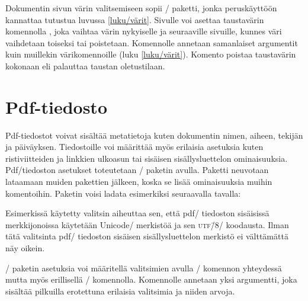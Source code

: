 Dokumentin sivun värin valitsemiseen sopii \-/
paketti, jonka peruskäyttöön kannattaa tutustua luvussa
\ref{luku/värit}. Sivulle voi asettaa taustavärin komennolla
, joka vaihtaa värin nykyiselle ja seuraaville
sivuille, kunnes väri vaihdetaan toiseksi tai poistetaan. Komennolle
annetaan samanlaiset argumentit kuin muillekin värikomennoille (luku
\ref{luku/värit}). Komento  poistaa taustavärin
kokonaan eli palauttaa taustan oletustilaan.

\begin{koodilohkosis}
\pagecolor{nimi} %
\pagecolor[värimalli]{parametrit}
\nopagecolor
\end{koodilohkosis}

\section{Pdf-tiedosto}
\label{luku/pdf-asetukset}

Pdf-tiedostot voivat sisältää metatietoja kuten dokumentin nimen,
aiheen, tekijän ja päiväyksen. Tiedostoille voi määrittää myös erilaisia
asetuksia kuten ristiviitteiden ja linkkien ulkoasun tai sisäisen
sisällysluettelon ominaisuuksia. Pdf\-/tiedoston asetukset toteutetaan
\-/ paketin avulla. Paketti neuvotaan lataamaan
muiden pakettien jälkeen, koska se lisää ominaisuuksia muihin
komentoihin. Paketin voisi ladata esimerkiksi seuraavalla tavalla:

\begin{koodilohkosis}
\usepackage[unicode]{hyperref}
\end{koodilohkosis}

\noindent
Esimerkissä käytetty valitsin  aiheuttaa sen, että pdf\-/
tiedoston sisäisissä merkkijonoissa käytetään Unicode\-/ merkistöä ja
sen \textsc{utf\=/8}\-/ koodausta. Ilman tätä valitsinta pdf\-/
tiedoston sisäisen sisällysluettelon merkistö ei välttämättä näy oikein.

\-/ paketin asetuksia voi määritellä valitsimien
avulla \-/ komennon yhteydessä mutta myös
erillisellä \-/ komennolla. Komennolle annetaan
yksi argumentti, joka sisältää pilkuilla erotettuna erilaisia valitsimia
ja niiden arvoja.

\begin{esimerkki*}

\begin{koodilohko}
\end{koodilohko}
  \caption{\-/ komennolla asetetaan
    \-/ paketin asetuksia, esimerkiksi pdf:n
    metatietoja}
  \label{esim/hypersetup}
\end{esimerkki*}

